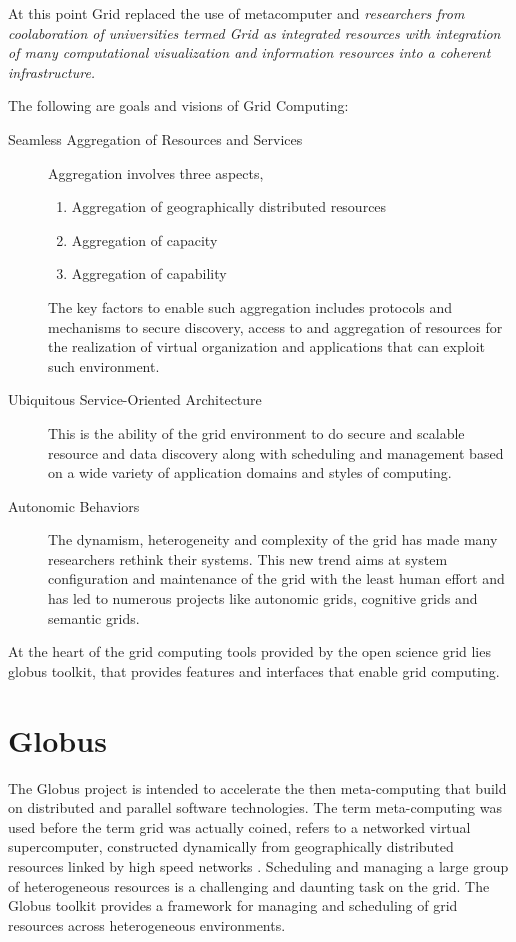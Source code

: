 \documentclass[ms,electronic,double]{nuthesis}
\begin{document}
At this point Grid replaced the use of metacomputer and \emph{ researchers from 
coolaboration of universities termed Grid as integrated resources 
with integration of many computational visualization and information resources 
into a coherent infrastructure.}

The following are goals and visions of Grid Computing:


\begin{description}
  \item[Seamless Aggregation of Resources and Services]
  Aggregation involves three aspects, 
  \begin{enumerate}
    \item{Aggregation of geographically distributed resources}
    \item{Aggregation of capacity}
    \item{Aggregation of capability}
      \end{enumerate}
    The key factors to enable such aggregation includes protocols and mechanisms 
    to secure discovery, access to and aggregation of resources for the 
    realization of virtual organization and applications that can exploit such 
    environment.

  \item[Ubiquitous Service-Oriented Architecture] This is the ability of the grid 
  environment to do secure and scalable resource and data discovery along with scheduling and 
  management based on a wide variety of application domains and styles of 
  computing.
  
  \item[Autonomic Behaviors]
  The dynamism, heterogeneity and complexity of the grid has made many 
  researchers rethink their systems. This new trend aims at system configuration 
  and maintenance of the grid with the least human effort and has led to numerous 
  projects like autonomic grids, cognitive grids and semantic grids.
  
\end{description}

At the heart of the grid computing tools provided by the open science grid lies globus toolkit, that provides
features and interfaces that enable grid computing. 
\section{Globus}
The Globus project is intended to accelerate the then meta-computing that build on 
distributed and parallel software technologies. The term meta-computing was used 
before the term grid was actually coined, refers to 
a networked virtual supercomputer, constructed dynamically from geographically 
distributed resources linked by high speed networks \cite{globus}. Scheduling 
and managing a large group of heterogeneous resources is a challenging and 
daunting task on the grid. The Globus toolkit provides a framework for managing 
and scheduling of grid resources across heterogeneous environments.
\end{document}
